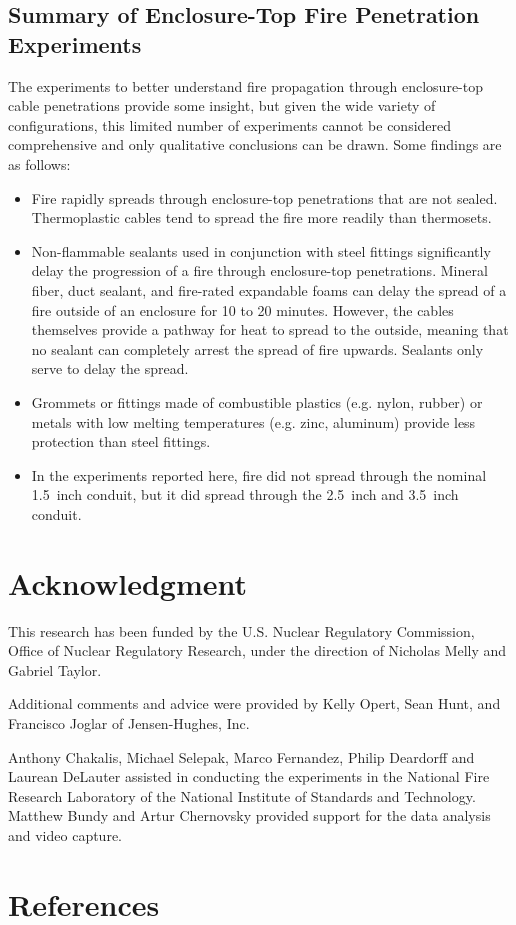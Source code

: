 \clearpage

\subsection{Summary of Enclosure-Top Fire Penetration Experiments}

The experiments to better understand fire propagation through enclosure-top cable penetrations provide some insight, but given the wide variety of configurations, this limited number of experiments cannot be considered comprehensive and only qualitative conclusions can be drawn. Some findings are as follows:
\begin{itemize}
\item Fire rapidly spreads through enclosure-top penetrations that are not sealed. Thermoplastic cables tend to spread the fire more readily than thermosets.
\item Non-flammable sealants used in conjunction with steel fittings significantly delay the progression of a fire through enclosure-top penetrations. Mineral fiber, duct sealant, and fire-rated expandable foams can delay the spread of a fire outside of an enclosure for 10 to 20 minutes. However, the cables themselves provide a pathway for heat to spread to the outside, meaning that no sealant can completely arrest the spread of fire upwards. Sealants only serve to delay the spread.
\item Grommets or fittings made of combustible plastics (e.g. nylon, rubber) or metals with low melting temperatures (e.g. zinc, aluminum) provide less protection than steel fittings.
\item In the experiments reported here, fire did not spread through the nominal 1.5~inch conduit, but it did spread through the 2.5~inch and 3.5~inch conduit.
\end{itemize}


\newpage

\section{Acknowledgment}

This research has been funded by the U.S. Nuclear Regulatory Commission, Office of Nuclear Regulatory Research, under the direction of Nicholas Melly and Gabriel Taylor.

Additional comments and advice were provided by Kelly Opert, Sean Hunt, and Francisco Joglar of Jensen-Hughes, Inc.

Anthony Chakalis, Michael Selepak, Marco Fernandez, Philip Deardorff and Laurean DeLauter assisted in conducting the experiments in the National Fire Research Laboratory of the National Institute of Standards and Technology. Matthew Bundy and Artur Chernovsky provided support for the data analysis and video capture.



\clearpage

\section{References}







